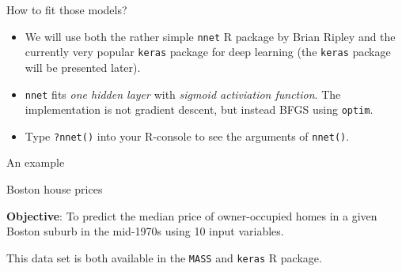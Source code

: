 \documentclass[
  10pt,
  ignorenonframetext,
]{beamer}
\providecommand{\tightlist}{%
  \setlength{\itemsep}{0pt}\setlength{\parskip}{0pt}}
\begin{document}
\begin{frame}[fragile]
\begin{block}{How to fit those models?}
\protect\hypertarget{how-to-fit-those-models}{}
\(~\)

\begin{itemize}
\item
  We will use both the rather simple \texttt{nnet} R package by Brian
  Ripley and the currently very popular \texttt{keras} package for deep
  learning (the \texttt{keras} package will be presented later).
  \vspace{2mm}
\item
  \texttt{nnet} fits \emph{one hidden layer} with \emph{sigmoid
  activiation function}. The implementation is not gradient descent, but
  instead BFGS using \texttt{optim}. \vspace{2mm}
\end{itemize}

\begin{itemize}
\tightlist
\item
  Type \texttt{?nnet()} into your R-console to see the arguments of
  \texttt{nnet()}.
\end{itemize}

\vspace{2mm}
\end{block}
\end{frame}

\begin{frame}[fragile]{An example}
\protect\hypertarget{an-example}{}
\begin{block}{Boston house prices}
\protect\hypertarget{boston-house-prices}{}
\vspace{2mm}

\textbf{Objective}: To predict the median price of owner-occupied homes
in a given Boston suburb in the mid-1970s using 10 input variables.

This data set is both available in the \texttt{MASS} and \texttt{keras}
R package.

\(~\)
\end{block}
\end{frame}
\end{document}
